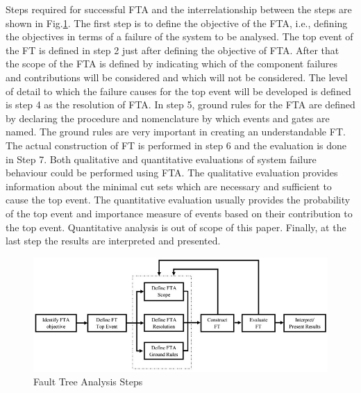 \documentclass[10pt]{llncs}
\begin{document}
Steps required for successful FTA and the interrelationship between the steps are shown in Fig.\ref{fig4}. The first step is to define the objective of the FTA, i.e., defining the objectives in terms of a failure of the system to be analysed. The top event of the FT is defined in step 2 just after defining the objective of FTA. After that the scope of the FTA is defined by indicating which of the component failures and contributions will be considered and which will not be considered. The level of detail to which the failure causes for the top event will be developed is defined is step 4 as the resolution of FTA. In step 5, ground rules for the FTA are defined by declaring the procedure and nomenclature by which events and gates are named. The ground rules are very important in creating an understandable FT. The actual construction of FT is performed in step 6 and the evaluation is done in Step 7. Both qualitative and quantitative evaluations of system failure behaviour could be performed using FTA. The qualitative evaluation provides information about the minimal cut sets which are necessary and sufficient to cause the top event. The quantitative evaluation usually provides the probability of the top event and importance measure of events based on their contribution to the top event. Quantitative analysis is out of scope of this paper. Finally, at the last step the results are interpreted and presented.   
	
	\begin{figure}[thpb]
      \centering
     
			\includegraphics[scale=0.5]{block_diagram1}%
 	  
      \caption{Fault Tree Analysis Steps\cite{Vesely2002}}
      \label{fig4}
   \end{figure}	
\end{document}
